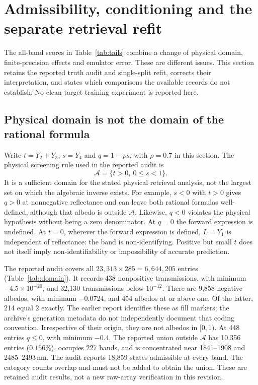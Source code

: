 \section{Admissibility, conditioning and the separate retrieval refit}
\label{sec:constrained}

The all-band scores in Table~\ref{tab:tails} combine a change of physical domain,
finite-precision effects and emulator error. These are different issues. This section
retains the reported truth audit and single-split refit, corrects their interpretation,
and states which comparisons the available records do not establish. No clean-target
training experiment is reported here.

\subsection{Physical domain is not the domain of the rational formula}
Write $t=Y_2+Y_3$, $s=Y_4$ and $q=1-\rho s$, with $\rho=0.7$ in this section.
The physical screening rule used in the reported audit is
\[
  \mathcal A=\{t>0,\ 0\le s<1\}.
\]
It is a sufficient domain for the stated physical retrieval analysis, not the largest set
on which the algebraic inverse exists. For example, $s<0$ with $t>0$ gives $q>0$ at
nonnegative reflectance and can leave both rational formulas well-defined, although that
albedo is outside $\mathcal A$. Likewise, $q<0$ violates the physical hypothesis without
being a zero denominator. At $q=0$ the forward expression is undefined. At $t=0$, wherever
the forward expression is defined, $L=Y_1$ is independent of reflectance: the band is
non-identifying. Positive but small $t$ does not itself imply non-identifiability or
impossibility of accurate prediction.

The reported audit covers all $23{,}313\times285=6{,}644{,}205$ entries
(Table~\ref{tab:domain}). It records 438 nonpositive transmissions, with minimum
$-4.5\times10^{-20}$, and 32{,}130 transmissions below $10^{-12}$. There are 9{,}858
negative albedos, with minimum $-0.0724$, and 454 albedos at or above one. Of the latter,
214 equal $2$ exactly. The earlier report identifies these as fill markers; the archive's
generation metadata do not independently document that coding convention. Irrespective
of their origin, they are not albedos in $[0,1)$. At 448 entries $q\le0$, with minimum
$-0.4$. The reported union outside $\mathcal A$ has 10{,}356 entries ($0.156\%$),
occupies 227 bands, and is concentrated near 1841--1908 and 2485--2493\,nm. The audit
reports 18{,}859 states admissible at every band. The category counts overlap and must
not be added to obtain the union. These are retained audit results, not a new raw-array
verification in this revision.

